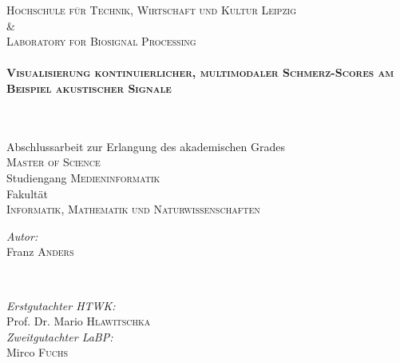 \begin{titlepage}
\large \textsc{Hochschule für Technik, Wirtschaft und Kultur Leipzig}\\
\& \\
\large \textsc{Laboratory for Biosignal Processing} \\[0.5cm]



\HRule \\[0.4cm]
{ \huge \bfseries \textsc{Visualisierung kontinuierlicher, multimodaler Schmerz-Scores am \\[0.3cm] Beispiel akustischer Signale}}
\subtitle{Masterarbeit}\\[0.2cm] %
\HRule \\[2cm]
 
\large Abschlussarbeit zur Erlangung des akademischen Grades \\ 
\textsc{Master of Science}\\[1cm]

\large Studiengang \textsc{Medieninformatik}\\[1cm]
 \large Fakultät \\ \textsc{Informatik, Mathematik und Naturwissenschaften}\\[1.3cm]


\begin{minipage}{0.4\textwidth}
\begin{flushleft} \large
\emph{Autor:}\\
Franz \textsc{Anders} %
\end{flushleft}
\end{minipage}
~
\begin{minipage}{0.4\textwidth}
\begin{flushright} \large
\emph{Erstgutachter HTWK:} \\
Prof. Dr. Mario \textsc{Hlawitschka} %
\\[0.5cm]
\emph{Zweitgutachter LaBP:} \\
Mirco \textsc{Fuchs}
\end{flushright}
\end{minipage}\\[2cm]


\end{titlepage}
